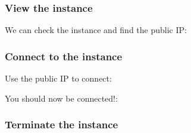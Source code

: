 \subsubsection{View the instance}\label{view-the-instance}

We can check the instance and find the public IP:

\begin{Shaded}
\begin{Highlighting}[]
\NormalTok{$ } 
\end{Highlighting}
\end{Shaded}

\subsubsection{Connect to the instance}\label{connect-to-the-instance}

Use the public IP to connect:

\begin{Shaded}
\begin{Highlighting}[]
\NormalTok{$ } \KeywordTok{<}\KeywordTok{>} \KeywordTok{<}\KeywordTok{>}
\end{Highlighting}
\end{Shaded}

You should now be connected!:

\begin{Shaded}
\begin{Highlighting}[]
       \KeywordTok{__|}  \KeywordTok{__|_}  \NormalTok{)}
       \KeywordTok{_|} \DataTypeTok{\textbackslash{}(}     \KeywordTok{/}   
      \KeywordTok{___|}\DataTypeTok{\textbackslash{}\textbackslash{}}\KeywordTok{___|___|}

\NormalTok{[} \NormalTok{~]$}
\end{Highlighting}
\end{Shaded}

\subsubsection{Terminate the instance}\label{terminate-the-instance}

